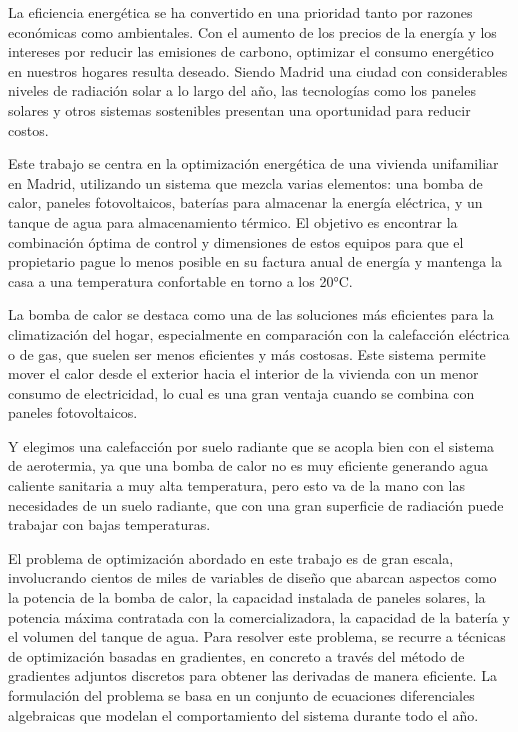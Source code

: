 La eficiencia energética se ha convertido en una prioridad tanto por razones
económicas como ambientales. Con el aumento de los precios de la energía y los
intereses por reducir las emisiones de carbono, optimizar el consumo energético
en nuestros hogares resulta deseado. Siendo Madrid una ciudad con considerables
niveles de radiación solar a lo largo del año, las tecnologías como los paneles
solares y otros sistemas sostenibles presentan una oportunidad para reducir
costos.

Este trabajo se centra en la optimización energética de una vivienda
unifamiliar en Madrid, utilizando un sistema que mezcla varias elementos: una
bomba de calor, paneles fotovoltaicos, baterías para almacenar la energía
eléctrica, y un tanque de agua para almacenamiento térmico. El objetivo es
encontrar la combinación óptima de control y dimensiones de estos equipos para
que el propietario pague lo menos posible en su factura anual de energía y
mantenga la casa a una temperatura confortable en torno a los 20°C.

La bomba de calor se destaca como una de las soluciones más eficientes para la
climatización del hogar, especialmente en comparación con la calefacción
eléctrica o de gas, que suelen ser menos eficientes y más costosas. Este
sistema permite mover el calor desde el exterior hacia el interior de la
vivienda con un menor consumo de electricidad, lo cual es una gran ventaja
cuando se combina con paneles fotovoltaicos.

Y elegimos una calefacción por suelo radiante que se acopla bien con el sistema
de aerotermia, ya que una bomba de calor no es muy eficiente generando agua
caliente sanitaria a muy alta temperatura, pero esto va de la mano con las
necesidades de un suelo radiante, que con una gran superficie de radiación
puede trabajar con bajas temperaturas.

El problema de optimización abordado en este trabajo es de gran escala,
involucrando cientos de miles de variables de diseño que abarcan aspectos como
la potencia de la bomba de calor, la capacidad instalada de paneles solares, la
potencia máxima contratada con la comercializadora, la capacidad de la batería
y el volumen del tanque de agua. Para resolver este problema, se recurre a
técnicas de optimización basadas en gradientes, en concreto a través del método
de gradientes adjuntos discretos para obtener las derivadas de manera
eficiente. La formulación del problema se basa en un conjunto de ecuaciones
diferenciales algebraicas que modelan el comportamiento del sistema durante
todo el año.

